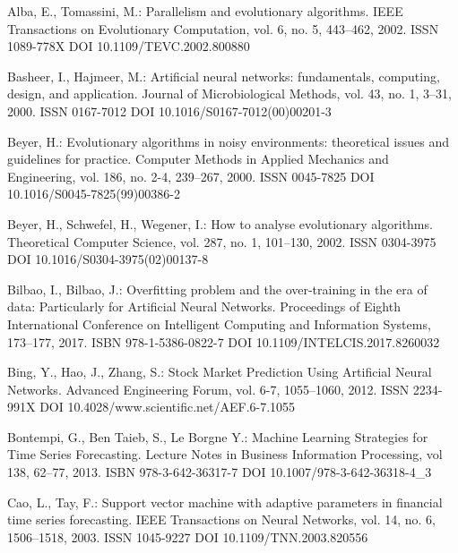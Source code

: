 
\begin{thebibliography}{99.}

 Alba, E., Tomassini, M.: Parallelism and evolutionary algorithms. IEEE Transactions on Evolutionary Computation, vol. 6, no. 5, 443--462, 2002. ISSN 1089-778X DOI 10.1109/TEVC.2002.800880

 Basheer, I., Hajmeer, M.: Artificial neural networks: fundamentals, computing, design, and application. Journal of Microbiological Methods, vol. 43, no. 1, 3--31, 2000. ISSN 0167-7012 DOI 10.1016/S0167-7012(00)00201-3

 Beyer, H.: Evolutionary algorithms in noisy environments: theoretical issues and guidelines for practice. Computer Methods in Applied Mechanics and Engineering, vol. 186, no. 2-4, 239--267, 2000. ISSN 0045-7825 DOI 10.1016/S0045-7825(99)00386-2

 Beyer, H., Schwefel, H., Wegener, I.: How to analyse evolutionary algorithms. Theoretical Computer Science, vol. 287, no. 1, 101--130, 2002. ISSN 0304-3975 DOI 10.1016/S0304-3975(02)00137-8

 Bilbao, I., Bilbao, J.: Overfitting problem and the over-training in the era of data: Particularly for Artificial Neural Networks. Proceedings of Eighth International Conference on Intelligent Computing and Information Systems, 173--177, 2017. ISBN 978-1-5386-0822-7 DOI 10.1109/INTELCIS.2017.8260032

 Bing, Y., Hao, J., Zhang, S.: Stock Market Prediction Using Artificial Neural Networks. Advanced Engineering Forum, vol. 6-7, 1055--1060, 2012. ISSN 2234-991X DOI 10.4028/www.scientific.net/AEF.6-7.1055

 Bontempi, G., Ben Taieb, S., Le Borgne Y.: Machine Learning Strategies for Time Series Forecasting. Lecture Notes in Business Information Processing, vol 138, 62--77, 2013. ISBN 978-3-642-36317-7 DOI 10.1007/978-3-642-36318-4\_3

 Cao, L., Tay, F.: Support vector machine with adaptive parameters in financial time series forecasting. IEEE Transactions on Neural Networks, vol. 14, no. 6, 1506--1518, 2003. ISSN 1045-9227 DOI 10.1109/TNN.2003.820556


\end{thebibliography}
